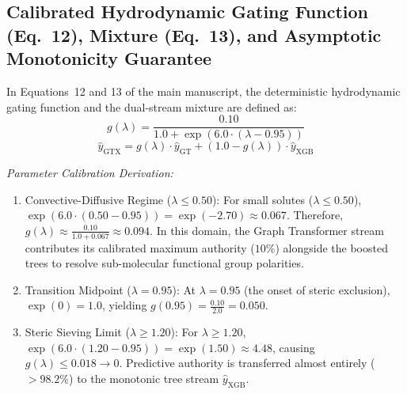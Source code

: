 \documentclass[11pt]{article}
\begin{document}
\subsection{Calibrated Hydrodynamic Gating Function (Eq.~12), Mixture (Eq.~13), and Asymptotic Monotonicity Guarantee}
\label{sec:calibrated_gating_proof}

In Equations~12 and 13 of the main manuscript, the deterministic hydrodynamic gating function and the dual-stream mixture are defined as:
\begin{equation}
g(\lambda) = \frac{0.10}{1.0 + \exp\left(6.0 \cdot (\lambda - 0.95)\right)}
\label{eq:s_gate}
\end{equation}
\begin{equation}
\hat{y}_{\mathrm{GTX}} = g(\lambda) \cdot \hat{y}_{\mathrm{GT}} + \left(1.0 - g(\lambda)\right) \cdot \hat{y}_{\mathrm{XGB}}
\label{eq:s_mixture}
\end{equation}

\noindent\textit{Parameter Calibration Derivation:}
\begin{enumerate}[leftmargin=1.0cm]
    \item Convective-Diffusive Regime ($\lambda \le 0.50$): For small solutes ($\lambda \le 0.50$), $\exp(6.0 \cdot (0.50 - 0.95)) = \exp(-2.70) \approx 0.067$. Therefore, $g(\lambda) \approx \frac{0.10}{1.0 + 0.067} \approx 0.094$. In this domain, the Graph Transformer stream contributes its calibrated maximum authority ($10\%$) alongside the boosted trees to resolve sub-molecular functional group polarities.
    \item Transition Midpoint ($\lambda = 0.95$): At $\lambda = 0.95$ (the onset of steric exclusion), $\exp(0) = 1.0$, yielding $g(0.95) = \frac{0.10}{2.0} = 0.050$.
    \item Steric Sieving Limit ($\lambda \ge 1.20$): For $\lambda \ge 1.20$, $\exp(6.0 \cdot (1.20 - 0.95)) = \exp(1.50) \approx 4.48$, causing $g(\lambda) \le 0.018 \to 0$. Predictive authority is transferred almost entirely ($>98.2\%$) to the monotonic tree stream $\hat{y}_{\mathrm{XGB}}$.
\end{enumerate}
\end{document}

